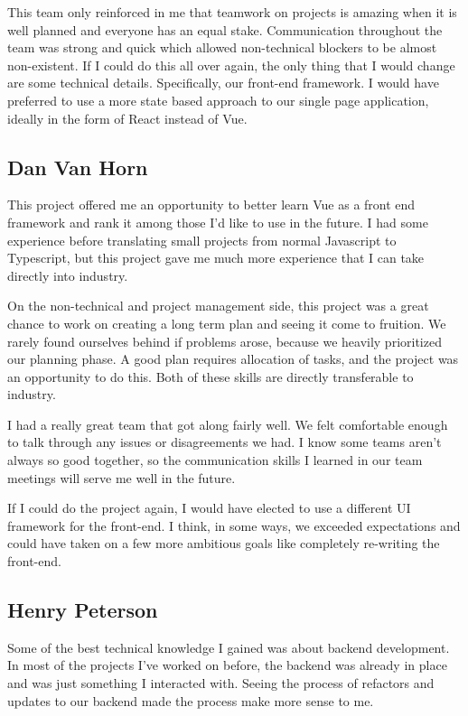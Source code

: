 \documentclass[draftclsnofoot,onecolumn,journal,letterpaper,compsoc,10pt]{IEEEtran}
\begin{document}
This team only reinforced in me that teamwork on projects is amazing when it is well planned and everyone has an equal stake.  Communication throughout the team was strong and quick which allowed non-technical blockers to be almost non-existent.  If I could do this all over again, the only thing that I would change are some technical details.  Specifically, our front-end framework.  I would have preferred to use a more state based approach to our single page application, ideally in the form of React instead of Vue.

\subsection{Dan Van Horn}
This project offered me an opportunity to better learn Vue as a front end framework and rank it among those I'd like to use in the future. I had some experience before translating small projects from normal Javascript to Typescript, but this project gave me much more experience that I can take directly into industry.

On the non-technical and project management side, this project was a great chance to work on creating a long term plan and seeing it come to fruition. We rarely found ourselves behind if problems arose, because we heavily prioritized our planning phase. A good plan requires allocation of tasks, and the project was an opportunity to do this. Both of these skills are directly transferable to industry.

I had a really great team that got along fairly well. We felt comfortable enough to talk through any issues or disagreements we had. I know some teams aren't always so good together, so the communication skills I learned in our team meetings will serve me well in the future. 

If I could do the project again, I would have elected to use a different UI framework for the front-end. I think, in some ways, we exceeded expectations and could have taken on a few more ambitious goals like completely re-writing the front-end.
\subsection{Henry Peterson}
Some of the best technical knowledge I gained was about backend development. In most of the projects I've worked on before, the backend was already in place and was just something I interacted with. Seeing the process of refactors and updates to our backend made the process make more sense to me.
\end{document}
